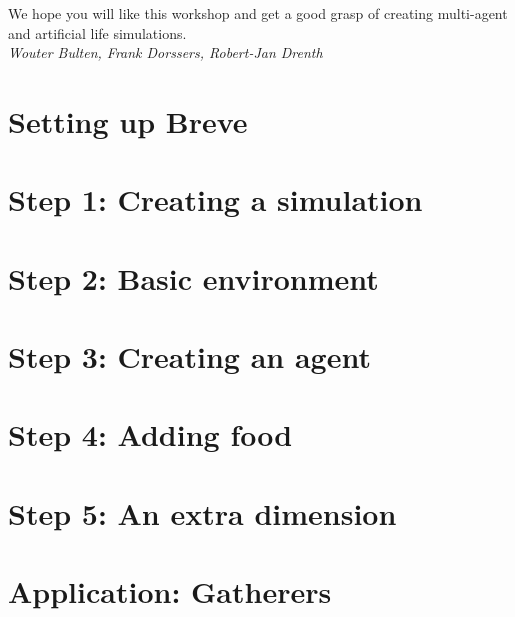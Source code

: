 \documentclass[a4paper]{tufte-book}
\begin{document}
We hope you will like this workshop and get a good grasp of creating multi-agent and artificial life simulations.\\[1cm]

\textit{Wouter Bulten, Frank Dorssers, Robert-Jan Drenth}
\mainmatter
\chapter{Setting up Breve}


\chapter{Step 1:  Creating a simulation}


\chapter{Step 2: Basic environment}


\chapter{Step 3: Creating an agent}


\chapter{Step 4: Adding food}


\chapter{Step 5: An extra dimension}


\chapter{Application: Gatherers}





\end{document}
